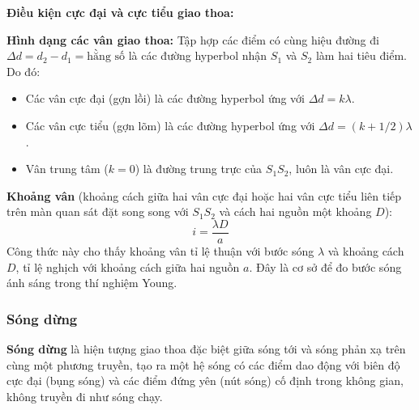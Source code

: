 \textbf{Điều kiện cực đại và cực tiểu giao thoa:}

\begin{center}
\end{center}

\textbf{Hình dạng các vân giao thoa:} Tập hợp các điểm có cùng hiệu đường đi $\Delta d = d_2 - d_1 = \text{hằng số}$ là các đường hyperbol nhận $S_1$ và $S_2$ làm hai tiêu điểm. Do đó:
\begin{itemize}
    \item Các vân cực đại (gợn lồi) là các đường hyperbol ứng với $\Delta d = k\lambda$.
    \item Các vân cực tiểu (gợn lõm) là các đường hyperbol ứng với $\Delta d = (k+1/2)\lambda$.
    \item Vân trung tâm ($k = 0$) là đường trung trực của $S_1S_2$, luôn là vân cực đại.
\end{itemize}

\textbf{Khoảng vân} (khoảng cách giữa hai vân cực đại hoặc hai vân cực tiểu liên tiếp trên màn quan sát đặt song song với $S_1S_2$ và cách hai nguồn một khoảng $D$):
\[
    i = \dfrac{\lambda D}{a}
\]
Công thức này cho thấy khoảng vân tỉ lệ thuận với bước sóng $\lambda$ và khoảng cách $D$, tỉ lệ nghịch với khoảng cách giữa hai nguồn $a$. Đây là cơ sở để đo bước sóng ánh sáng trong thí nghiệm Young.

\subsubsection{Sóng dừng}

\textbf{Sóng dừng} là hiện tượng giao thoa đặc biệt giữa sóng tới và sóng phản xạ trên cùng một phương truyền, tạo ra một hệ sóng có các điểm dao động với biên độ cực đại (bụng sóng) và các điểm đứng yên (nút sóng) cố định trong không gian, không truyền đi như sóng chạy.

